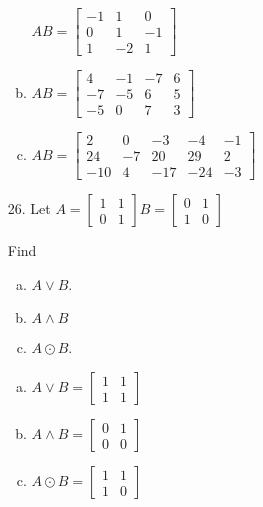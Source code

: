 \begin{itemize}
\begin{enumerate}[a.]
                  $AB = \begin{bmatrix}
                        -1 & 1  & 0  \\
                        0  & 1  & -1 \\
                        1  & -2 & 1
                     \end{bmatrix}$
            \item
                  $AB = \begin{bmatrix}
                        4  & -1 & -7 & 6 \\
                        -7 & -5 & 6  & 5 \\
                        -5 & 0  & 7  & 3
                     \end{bmatrix}$
            \item
                  $AB = \begin{bmatrix}
                        2   & 0  & -3  & -4  & -1 \\
                        24  & -7 & 20  & 29  & 2  \\
                        -10 & 4  & -17 & -24 & -3
                     \end{bmatrix}$ \vspace{3mm}
         \end{enumerate}
   \item[26.] Let $A = \begin{bmatrix} 1 & 1 \\ 0 & 1 \end{bmatrix} B = \begin{bmatrix} 0 & 1 \\ 1 & 0 \end{bmatrix}$

         Find
         \begin{enumerate}[a.]
            \item $A \lor B$.
            \item $A \land B$
            \item $A \odot B$.
         \end{enumerate}
         \answer
         \begin{enumerate}[a.]
            \item $A \lor B = \begin{bmatrix} 1 & 1 \\ 1 & 1 \end{bmatrix}$
            \item $A \land B = \begin{bmatrix} 0 & 1 \\ 0 & 0 \end{bmatrix}$
            \item $A \odot B = \begin{bmatrix} 1 & 1 \\ 1 & 0 \end{bmatrix}$
         \end{enumerate}
\end{itemize}
